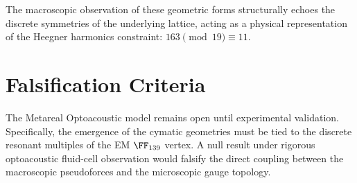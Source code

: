 The macroscopic observation of these geometric forms structurally echoes the discrete symmetries of the underlying lattice, acting as a physical representation of the Heegner harmonics constraint: $163 \pmod{19} \equiv 11$.

\section{Falsification Criteria}
The Metareal Optoacoustic model remains open until experimental validation. Specifically, the emergence of the cymatic geometries must be tied to the discrete resonant multiples of the EM $\FF_{139}$ vertex. A null result under rigorous optoacoustic fluid-cell observation would falsify the direct coupling between the macroscopic pseudoforces and the microscopic gauge topology.
